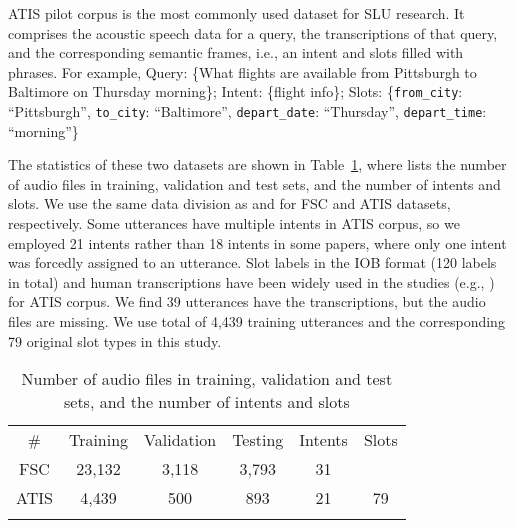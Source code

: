 \documentclass{article}
\begin{document}
ATIS pilot corpus is the most commonly used dataset for SLU research. It comprises the acoustic speech data for a query, the transcriptions of that query, and the corresponding semantic frames, i.e., an intent and slots filled with phrases. For example, Query: \{What flights are available from Pittsburgh to Baltimore on Thursday morning\}; Intent: \{flight info\}; Slots: \{\texttt{from\_city}: “Pittsburgh”, \texttt{to\_city}: “Baltimore”, \texttt{depart\_date}: “Thursday”, \texttt{depart\_time}: “morning”\}

The statistics of these two datasets are shown in Table~\ref{tab:data}, where lists the number of audio files in training, validation and test sets, and the number of intents and slots. We use the same data division as \cite{lugosch2019speech} and \cite{goo-etal-2018-slot,DBLP:journals/corr/abs-1902-10909} for FSC and ATIS datasets, respectively. Some utterances have multiple intents in ATIS corpus, so we employed 21 intents rather than 18 intents in some papers, where only one intent was forcedly assigned to an utterance. Slot labels in the IOB format (120 labels in total) and human transcriptions have been widely used in the studies (e.g., \cite{DBLP:journals/corr/abs-1902-10909}) for ATIS corpus. We find 39 utterances have the transcriptions, but the audio files are missing. We use total of 4,439 training utterances and the corresponding 79 original slot types in this study.

\begin{table}
\caption{Number of audio files in training, validation and test sets, and the number of intents and slots}
\smallskip
\renewcommand{\arraystretch}{1.3}
\label{tab:data}       \centering
\begin{tabular}{cccccc}
\hline \hline\noalign{\smallskip}
\# & Training & Validation & Testing & Intents & Slots \\ 
\noalign{\smallskip}\hline
FSC & 23,132 & 3,118 & 3,793 & 31 &  \\ 
ATIS & 4,439 & 500 & 893 & 21 & 79 \\ 
\noalign{\smallskip}\hline\hline
\end{tabular}
\end{table}
\end{document}
